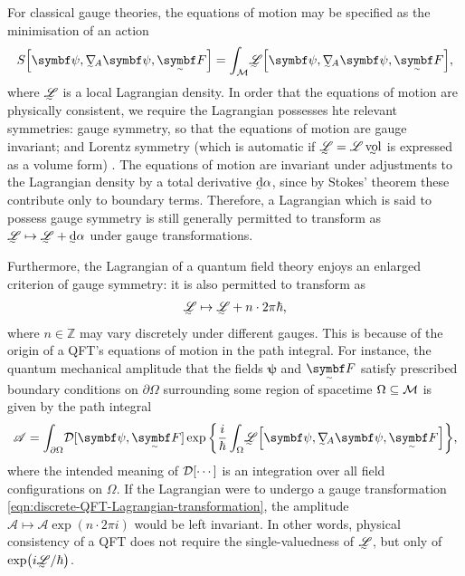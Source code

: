 For classical gauge theories, the equations of motion may be specified as the minimisation of an action
\begin{align}
	S\qty[\bm\psi, \ts\nabla_{\!A}\bm\psi, \tsbm F] = \int_{\cal M}\! \LL\qty[\bm\psi, \ts\nabla_{\!A}\bm\psi, \tsbm F]
,\end{align}
where $\LL$ is a local Lagrangian density.
In order that the equations of motion are physically consistent, we require the Lagrangian possesses hte relevant symmetries: gauge symmetry, so that the equations of motion are gauge invariant; and Lorentz symmetry (which is automatic if $\LL = \mathscr{L}\,\vol$ is expressed as a volume form) \cite[§\,7.1]{Hamilton_2017}.
The equations of motion are invariant under adjustments to the Lagrangian density by a total derivative $\ts\dd\alpha$, since by Stokes' theorem these contribute only to boundary terms.
Therefore, a Lagrangian which is said to possess gauge symmetry is still generally permitted to transform as
\begin{math}
	\LL \mapsto \LL + \ts\dd\alpha
\end{math}
under gauge transformations.

Furthermore, the Lagrangian of a quantum field theory enjoys an enlarged criterion of gauge symmetry: it is also permitted to transform as
\begin{align}
	\LL \mapsto \LL + n\cdot2\pi\hbar
	\label{eqn:discrete-QFT-Lagrangian-transformation}
,\end{align}
where $n \in \mathds Z$ may vary discretely under different gauges.
This is because of the origin of a QFT's equations of motion in the path integral.
For instance, the quantum mechanical amplitude that the fields $\bm\psi$ and $\tsbm F$ satisfy prescribed boundary conditions on $\partial\Omega$ surrounding some region of spacetime $\Omega \subseteq \cal M$ is given by the path integral
\begin{align}
	\mathscr A = \int_{\partial\Omega}\! \cal D[\bm\psi, \tsbm F] \exp\qty{\frac{i}{\hbar} \int_{\Omega}\! \LL\qty[\bm\psi, \ts\nabla_{\!A}\bm\psi, \tsbm F]}
	\label{eqn:path-integral}
,\end{align}
where the intended meaning of $\cal D[\cdots]$ is an integration over all field configurations on $\Omega$.
If the Lagrangian were to undergo a gauge transformation \eqref{eqn:discrete-QFT-Lagrangian-transformation}, the amplitude $\mathscr A \mapsto \mathscr A\exp(n\cdot2\pi i)$ would be left invariant.
In other words, physical consistency of a QFT does not require the single-valuedness of $\LL$, but only of $\exp(i\LL/\hbar)$.


